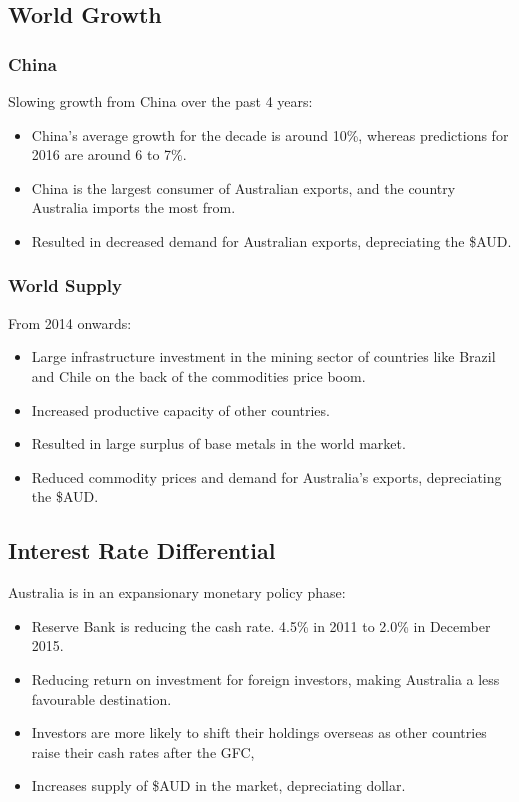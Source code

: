 \documentclass[a4paper,11pt]{article}
\begin{document}
\subsection{World Growth}

\subsubsection{China}

Slowing growth from China over the past 4 years:

\begin{itemize}
\item China's average growth for the decade is around 10\%, whereas predictions
	for 2016 are around 6 to 7\%.
\item China is the largest consumer of Australian exports, and the country
	Australia imports the most from.
\item Resulted in decreased demand for Australian exports, depreciating the
	\$AUD.
\end{itemize}


\subsubsection{World Supply}

From 2014 onwards:

\begin{itemize}
\item Large infrastructure investment in the mining sector of countries like
	Brazil and Chile on the back of the commodities price boom.
\item Increased productive capacity of other countries.
\item Resulted in large surplus of base metals in the world market.
\item Reduced commodity prices and demand for Australia's exports, depreciating
	the \$AUD.
\end{itemize}


\subsection{Interest Rate Differential}

Australia is in an expansionary monetary policy phase:

\begin{itemize}
\item Reserve Bank is reducing the cash rate. 4.5\% in 2011 to 2.0\% in
	December 2015.
\item Reducing return on investment for foreign investors, making Australia a
	less favourable destination.
\item Investors are more likely to shift their holdings overseas as other
	countries raise their cash rates after the GFC,
\item Increases supply of \$AUD in the market, depreciating dollar.
\end{itemize}
\end{document}
